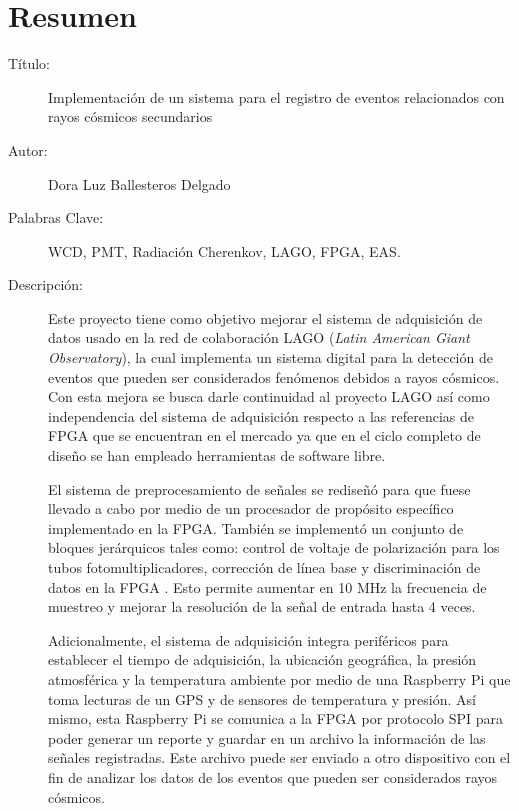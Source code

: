 \chapter*{Resumen}

\footnotesize{
\begin{description}
  \item[Título:] Implementación de un sistema para el registro de eventos relacionados con
rayos cósmicos secundarios 
  \item[Autor:] Dora Luz Ballesteros Delgado 
  \item[Palabras Clave:] WCD, PMT, Radiación Cherenkov, LAGO, FPGA, EAS.
  \item[Descripción:] 
  Este proyecto tiene como objetivo mejorar el sistema de adquisición de datos usado en la red de colaboración LAGO (\textit{Latin American Giant Observatory}), la cual implementa un sistema digital para la detección de eventos que pueden ser considerados fenómenos debidos a rayos cósmicos.
  Con esta mejora se busca darle continuidad al proyecto LAGO así como independencia del sistema de adquisición respecto a las referencias de FPGA que se encuentran en el mercado ya que en el ciclo completo de diseño se han empleado herramientas de software libre.

El sistema de preprocesamiento de señales se rediseñó para que fuese llevado a cabo por medio de un procesador de propósito específico implementado en la FPGA.
También se implementó un conjunto de bloques jerárquicos tales como: control de voltaje de polarización para los tubos fotomultiplicadores, corrección de línea base y discriminación de datos en la FPGA .
Esto permite aumentar en 10 MHz la frecuencia de muestreo y mejorar la resolución de la señal de entrada hasta 4 veces.

Adicionalmente, el sistema de adquisición integra periféricos para establecer el tiempo de adquisición, la ubicación geográfica, la presión atmosférica y la temperatura ambiente por medio de una Raspberry Pi que toma lecturas de un GPS y de sensores de temperatura y presión.
Así mismo, esta Raspberry Pi se comunica a la FPGA por protocolo SPI para poder generar un reporte y guardar en un archivo la información de las señales registradas.
Este archivo puede ser enviado a otro dispositivo con el fin de analizar los datos de los eventos que pueden ser considerados rayos cósmicos.



\end{description}}
